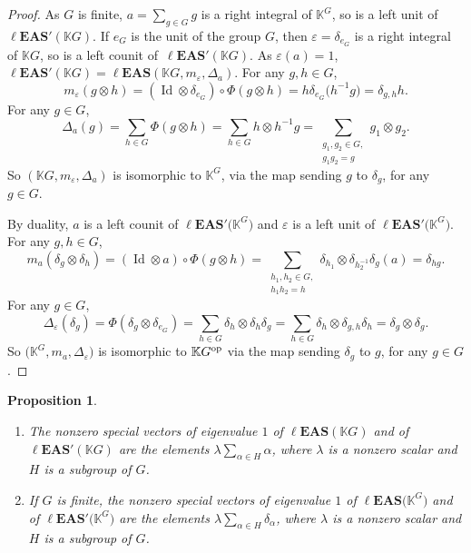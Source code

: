 \documentclass[10pt,a4paper]{amsart}
\numberwithin{equation}{section}
\newtheorem{Proposition}[Theorem]{Proposition}
 { \theoremstyle{definition}
\newtheorem{Definition}[Theorem]{Definition}
\newtheorem{Note}[Theorem]{Note}
\newtheorem{Example}[Theorem]{Example}
\newtheorem{Remark}[Theorem]{Remark}
\newtheorem{Notation}[Theorem]{Notation}}
\newcommand{\leas}{\ell\mathbf{EAS}}
\begin{document}
\begin{proof}
As $G$ is finite, $a= \sum_{g\in G} g$ is a right integral of $\mathbb{K}^G$, so is a left unit of $\leas'(\mathbb{K} G)$.
If $e_G$ is the unit of the group $G$, then $\varepsilon=\delta_{e_G}$ is a right integral of $\mathbb{K} G$, so is a left counit of~$\leas'(\mathbb{K} G)$. As $\varepsilon(a)=1$, $\leas'(\mathbb{K} G)=\leas(\mathbb{K} G,m_\varepsilon,\Delta_a)$. For any $g,h\in G$,
\[m_\varepsilon(g\otimes h)=(\operatorname{Id} \otimes \delta_{e_G})\circ \Phi(g\otimes h)=h \delta_{e_G}\bigl(h^{-1}g\bigr)=\delta_{g,h} h.\]
For any $g\in G$,
\[\Delta_a(g)=\sum_{h\in G}\Phi(g\otimes h)=\sum_{h\in G}h\otimes h^{-1}g=\sum_{\substack{g_1,g_2\in G,\\ g_1g_2=g}}g_1\otimes g_2.\]
So $(\mathbb{K} G,m_\varepsilon,\Delta_a)$ is isomorphic to $\mathbb{K}^G$, via the map sending $g$ to $\delta_g$, for any $g\in G$.

By duality, $a$ is a left counit of $\leas'\bigl(\mathbb{K}^G\bigr)$ and $\varepsilon$ is a left unit of $\leas'\bigl(\mathbb{K}^G\bigr)$. For any $g,h\in G$,
\[m_a(\delta_g \otimes \delta_h)=(\operatorname{Id} \otimes a)\circ \Phi(g\otimes h)=\sum_{\substack{h_1,h_2\in G,\\ h_1h_2=h}} \delta_{h_1}\otimes \delta_{h_2^{-1}}\delta_g(a)=\delta_{hg}. \]
For any $g\in G$,
\[\Delta_\varepsilon(\delta_g)=\Phi(\delta_g \otimes \delta_{e_G})=\sum_{h\in G}\delta_h \otimes \delta_h \delta_g=\sum_{h\in G}\delta_h \otimes \delta_{g,h} \delta_h=\delta_g \otimes \delta_g.\]
So $\bigl(\mathbb{K}^G,m_a,\Delta_\varepsilon\bigr)$ is isomorphic to $\mathbb{K} G^{\rm op}$ via the map sending $\delta_g$ to $g$, for any $g\in G$. \end{proof}

\begin{Proposition} \label{prop5.16}\quad
\begin{enumerate}\itemsep=0pt
\item[$(1)$] The nonzero special vectors of eigenvalue $1$ of $\leas(\mathbb{K} G)$ and of $\leas'(\mathbb{K} G)$ are the elements
$\lambda \sum_{\alpha \in H} \alpha$,
where $\lambda$ is a nonzero scalar and $H$ is a subgroup of $G$.
\item[$(2)$] If $G$ is finite, the nonzero special vectors of eigenvalue $1$ of $\leas\bigl(\mathbb{K}^G\bigr)$ and of $\leas'\bigl(\mathbb{K}^G\bigr)$ are the elements
$\lambda \sum_{\alpha \in H} \delta_\alpha$,
where $\lambda$ is a nonzero scalar and $H$ is a subgroup of $G$.
\end{enumerate} \end{Proposition}
\end{document}
